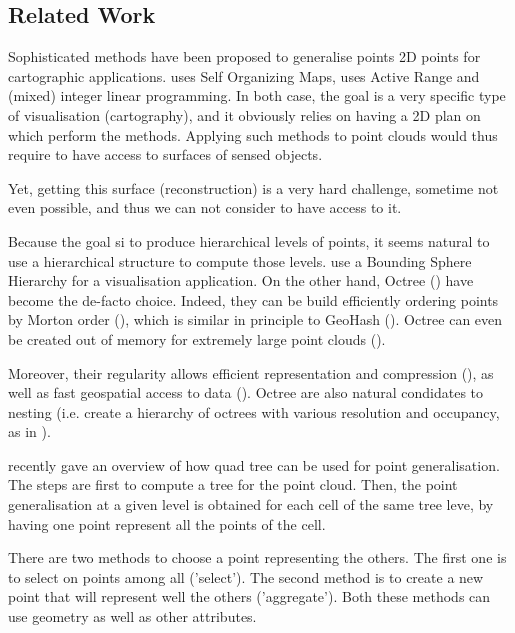 \subsection{Related Work} 

	Sophisticated methods have been proposed to generalise points 2D points for cartographic applications. \cite{Sester2001} uses Self Organizing Maps, \cite{Schwartges2013} uses Active Range and (mixed) integer
	linear programming.
	In both case, the goal is a very specific type of visualisation (cartography), and it obviously relies on having a 2D plan on which perform the methods.
	Applying such methods to point clouds would thus require to have access to surfaces of sensed objects.
	
	Yet, getting this surface (reconstruction) is a very hard challenge, sometime not even possible, and thus we can not consider to have access to it.
	
	Because the goal si to produce hierarchical levels of points, it seems natural to use a hierarchical structure to compute those levels.
	\cite{Rusinkiewicz2000} use a Bounding Sphere Hierarchy for a visualisation application.
	On the other hand, Octree (\cite{Meagher1982}) have become the de-facto choice.
	Indeed, they can be build efficiently ordering points by Morton order (\cite{Feng2014}),
	which is similar in principle to GeoHash (\cite{Sabo2014}).
	Octree can even be created out of memory for extremely large point clouds (\cite{Baert2014}). 
	
	Moreover, their regularity allows efficient representation and compression (\cite{Schnabel2006,Huang2006}), as well as fast geospatial access to data (\cite{Elseberg2013}).
	Octree are also natural condidates to nesting (i.e. create a hierarchy of octrees with various resolution and occupancy, as in \cite{Hornung2013}). 
	
	
	\cite{Bereuter2015} recently gave an overview of how quad tree can be used for point generalisation.
	The steps are first to compute a tree for the point cloud.
	Then, the point generalisation at a given level is obtained for each cell of the same tree leve, by having one point represent all the points of the cell.
	
	There are two methods to choose a point representing the others. The first one is to select on points among all ('select').
	The second method is to create a new point that will represent well the others ('aggregate'). 
	Both these methods can use geometry as well as other attributes.
	
